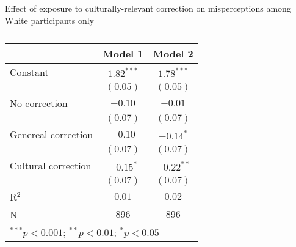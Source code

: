 
\begin{table}[h!]
\caption{Effect of exposure to culturally-relevant correction on misperceptions among White participants only}
\begin{center}
\begin{scriptsize}
\begin{tabular}{l c c}
\toprule
 & Model 1 & Model 2 \\
\midrule
Constant            & $1.82^{***}$ & $1.78^{***}$ \\
                    & $(0.05)$     & $(0.05)$     \\
No correction       & $-0.10$      & $-0.01$      \\
                    & $(0.07)$     & $(0.07)$     \\
Genereal correction & $-0.10$      & $-0.14^{*}$  \\
                    & $(0.07)$     & $(0.07)$     \\
Cultural correction & $-0.15^{*}$  & $-0.22^{**}$ \\
                    & $(0.07)$     & $(0.07)$     \\
\midrule
R$^2$               & $0.01$       & $0.02$       \\
N                   & $896$        & $896$        \\
\bottomrule
\multicolumn{3}{l}{\tiny{$^{***}p<0.001$; $^{**}p<0.01$; $^{*}p<0.05$}}
\end{tabular}
\end{scriptsize}
\label{table:ex-white}
\end{center}
  \caption*{\footnotesize }
\end{table}
